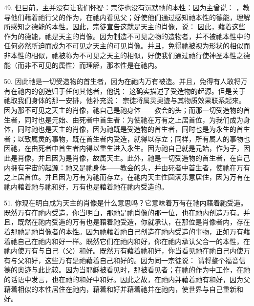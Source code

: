 49. 但目前，主并没有让我们怀疑：宗徒也没有沉默祂的本性：因为主曾说： ，教导他们藉着祂行父的作为，在祂内看见父；好使他们通过感知祂本性的德能，理解所感知之德能的本性。因此，宗徒宣告这就是天主的肖像，说：  因此，藉着这些作为的德能，祂是天主的肖像。因为制造不可见之物的造物者，并不被祂本性中的任何必然所迫而成为不可见之天主的可见肖像。并且，免得祂被视为形状的相似而非本性的相似，祂被称为不可见之天主的相似，好使我们通过祂行使神圣本性之德能（而非不可见的属性）而理解，那本性是在祂内。\par

50. 因此祂是一切受造物的首生者，因为在祂内万有被造。并且，免得有人敢将万有在祂内的创造归于任何其他者，他说： 这确实描述了受造物的起源。但是关于祂取我们身体的那一安排，他补充说： 宗徒将属灵奥迹与其物质效果联系起来。因为那不可见之天主的肖像，祂自己是祂身体——教会的头；而那一切受造物的首生者，同时也是元始、由死者中首生者：为使祂在万有之上居首位，为我们成为身体，同时祂也是天主的肖像，因为祂既是受造物的首生者，同时也是为永生的首生者；以致属灵的事物，既在首生者内受造，就得以存立；同样，所有属人的事物也因祂，在由死者中首生者内得以重生进入永生。因为祂自己就是元始，作为子，因此是肖像，并且因为是肖像，故属天主。此外，祂是一切受造物的首生者，在自己内拥有宇宙的起源：祂又是祂身体——教会的头，并由死者中首生者，使祂在万有之上居首位。并且因为万有为祂而存立，在祂内天主性圆满乐意居住，因为万有在祂内藉着祂与祂和好，万有也是藉着祂在祂内受造的。\par

51. 你现在明白成为天主的肖像是什么意思吗？它意味着万有在祂内藉着祂受造。既然万有在祂内受造，你当明白，那祂是祂肖像的那一位，也在祂内创造万有。并且，既然在祂内受造的万有也是藉着祂受造，你就承认，在那位是肖像者内，存在着那祂是祂肖像者的本性。因为祂藉着祂自己创造在祂内受造的事物，正如万有藉着祂自己在祂内和好一样。既然它们在祂内和好，你在祂内承认父合一的本性，在祂内使万有与自己（父）和好。既然万有藉着祂和好，你当看见祂在祂自己内使万有与父和好，这些万有是祂藉着自己和好的。因为同一宗徒说：  请将整个福音信德的奥迹与此比较。因为当耶稣被看见时，那被看见者；在祂的作为中工作，在祂的话语中发言，也在祂的和好中和好。因此之故，在祂内并藉着祂有和好，因为父藉着相似的本性居住在祂内，藉着和好并藉着祂并在祂内，使世界与自己重新和好。\par

